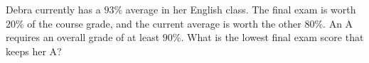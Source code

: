 Debra currently has a $93\%$ average in her English class. The final exam is worth $20\%$ of the course grade, and the current average is worth the other $80\%$. An A requires an overall grade of at least $90\%$. What is the lowest final exam score that keeps her A?
